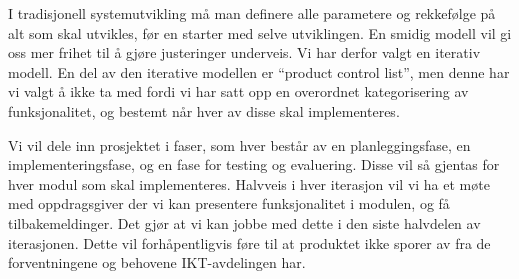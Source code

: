 I tradisjonell systemutvikling må man definere alle parametere og rekkefølge på alt som skal utvikles, før en starter med selve utviklingen. En smidig modell vil gi oss mer frihet til å gjøre justeringer underveis. Vi har derfor valgt en iterativ modell\cite{wiki:iterativ}. En del av den iterative modellen er “product control list”, men denne har vi valgt å ikke ta med fordi vi har satt opp en overordnet kategorisering av funksjonalitet, og bestemt når hver av disse skal implementeres.

Vi vil dele inn prosjektet i faser, som hver består av en planleggingsfase, en implementeringsfase, og en fase for testing og evaluering. Disse vil så gjentas for hver modul som skal implementeres. Halvveis i hver iterasjon vil vi ha et møte med oppdragsgiver der vi kan presentere funksjonalitet i modulen, og få tilbakemeldinger. Det gjør at vi kan jobbe med dette i den siste halvdelen av iterasjonen. Dette vil forhåpentligvis føre til at produktet ikke sporer av fra de forventningene og behovene IKT-avdelingen har.
